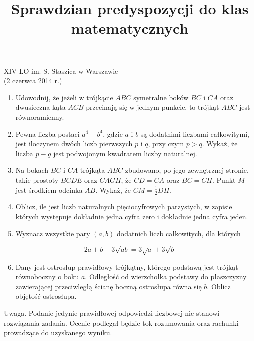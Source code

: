 \documentclass[10pt]{article}
\title{Sprawdzian predyspozycji do klas matematycznych }
\author{}
\date{}
\begin{document}
\maketitle
XIV LO im. S. Staszica w Warszawie\\
(2 czerwca 2014 r.)

\begin{enumerate}
  \item Udowodnij, że jeżeli w trójkącie \(A B C\) symetralne boków \(B C\) i \(C A\) oraz dwusieczna kąta \(A C B\) przecinają się w jednym punkcie, to trójkąt \(A B C\) jest równoramienny.
  \item Pewna liczba postaci \(a^{4}-b^{4}\), gdzie \(a\) i \(b\) są dodatnimi liczbami całkowitymi, jest iloczynem dwóch liczb pierwszych \(p\) i \(q\), przy czym \(p>q\). Wykaż, że liczba \(p-g\) jest podwojonym kwadratem liczby naturalnej.
  \item Na bokach \(B C\) i \(C A\) trójkąta \(A B C\) zbudowano, po jego zewnętrznej stronie, takie prostoty \(B C D E\) oraz \(C A G H\), że \(C D=C A\) oraz \(B C=C H\). Punkt \(M\) jest środkiem odcinka \(A B\). Wykaż, że \(C M=\frac{1}{2} D H\).
  \item Oblicz, ile jest liczb naturalnych pięciocyfrowych parzystych, w zapisie których występuje dokładnie jedna cyfra zero i dokładnie jedna cyfra jeden.
  \item Wyznacz wszystkie pary \((a, b)\) dodatnich liczb całkowitych, dla których
\end{enumerate}

\[
2 a+b+3 \sqrt{a b}=3 \sqrt{a}+3 \sqrt{b}
\]

\begin{enumerate}
  \setcounter{enumi}{5}
  \item Dany jest ostrosłup prawidłowy trójkątny, którego podstawą jest trójkąt równoboczny o boku \(a\). Odległość od wierzchołka podstawy do płaszczyzny zawierającej przeciwległą ścianę boczną ostrosłupa równa się \(b\). Oblicz objętość ostrosłupa.
\end{enumerate}

Uwaga. Podanie jedynie prawidłowej odpowiedzi liczbowej nie stanowi rozwiązania zadania. Ocenie podlegał będzie tok rozumowania oraz rachunki prowadzące do uzyskanego wyniku.
\end{document}
